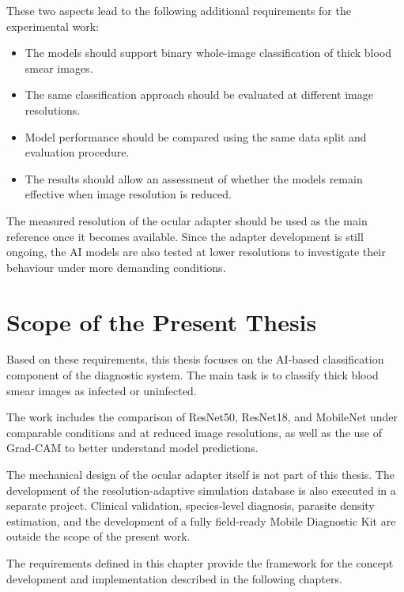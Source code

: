 These two aspects lead to the following additional requirements for the experimental work:

\begin{itemize}
    \item The models should support binary whole-image classification of thick blood smear images.
    \item The same classification approach should be evaluated at different image resolutions.
    \item Model performance should be compared using the same data split and evaluation procedure.
    \item The results should allow an assessment of whether the models remain effective when image resolution is reduced.
\end{itemize}

The measured resolution of the ocular adapter should be used as the main reference once it becomes available. Since the adapter development is still ongoing, the AI models are also tested at lower resolutions to investigate their behaviour under more demanding conditions.

\section{Scope of the Present Thesis}
\label{sec:requirements_scope}

Based on these requirements, this thesis focuses on the AI-based classification component of the diagnostic system. The main task is to classify thick blood smear images as infected or uninfected.

The work includes the comparison of ResNet50, ResNet18, and MobileNet under comparable conditions and at reduced image resolutions, as well as the use of Grad-CAM to better understand model predictions.

The mechanical design of the ocular adapter itself is not part of this thesis. The development of the resolution-adaptive simulation database is also executed in a separate project. Clinical validation, species-level diagnosis, parasite density estimation, and the development of a fully field-ready Mobile Diagnostic Kit are outside the scope of the present work.

The requirements defined in this chapter provide the framework for the concept development and implementation described in the following chapters.


